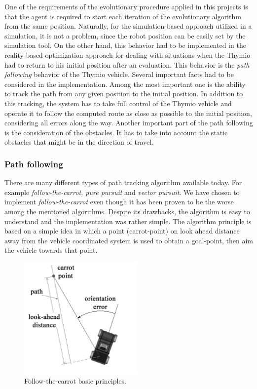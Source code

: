 One of the requirements of the evolutionary procedure applied in this projects is that the agent is required to start each iteration of the evolutionary algorithm from the same position. Naturally, for the simulation-based approach utilized in a simulation, it is not a problem, since the robot position can be easily set by the simulation tool. On the other hand, this behavior had to be implemented in the reality-based optimization approach for dealing with situations when the Thymio had to return to his initial position after an evaluation. This behavior is the \emph{path following} behavior of the Thymio vehicle. Several important facts had to be considered in the implementation. Among the most important one is the ability to track the path from any given position to the initial position. In addition to this tracking, the system has to take full control of the Thymio vehicle and operate it to follow the computed route as close as possible to the initial position, considering all errors along the way. Another important part of the path following is the consideration of the obstacles. It has to take into account the static obstacles that might be in the direction of travel.

\subsubsection{Path following}

There are many different types of path tracking algorithm available today. For example \emph{follow-the-carrot, pure pursuit} and \emph{vector pursuit}. We have chosen to implement \emph{follow-the-carrot} even though it has been proven \citep{lundgren2003path} to be the worse among the mentioned algorithms. Despite its drawbacks, the algorithm is easy to understand and the implementation was rather simple. The algorithm principle is based on a simple idea in which a point (carrot-point) on look ahead distance away from the vehicle coordinated system is used to obtain a goal-point, then aim the vehicle towards that point.

\begin{figure}[H]
  \centering	
  \includegraphics[width=6cm]{include/images/follow_the_carrot.PNG}
  \caption{Follow-the-carrot basic principles.}
  \label{fig:follow_the_carrot}
\end{figure}

